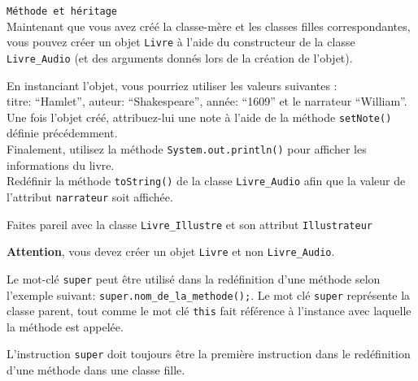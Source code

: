 \begin{Exercice}[5 minutes] \lstinline{Méthode et héritage} \\

Maintenant que vous avez créé la classe-mère et les classes filles correspondantes, vous pouvez créer un objet \lstinline{Livre} à l'aide du constructeur de la classe \lstinline{Livre_Audio} (et des arguments donnés lors de la création de l'objet).


En instanciant l'objet, vous pourriez utiliser les valeurs suivantes :\\
titre: ``Hamlet'', auteur: ``Shakespeare'', année: ``1609'' et le narrateur ``William''.\\

Une fois l'objet créé, attribuez-lui une note à l'aide de la méthode \lstinline{setNote()} définie précédemment.\\ 

Finalement, utilisez la méthode \lstinline{System.out.println()} pour afficher les informations du livre.\\

Redéfinir la méthode \lstinline{toString()} de la classe \lstinline{Livre_Audio} afin que la valeur de l'attribut \lstinline{narrateur} soit affichée.

Faites pareil avec la classe \lstinline{Livre_Illustre} et son attribut \lstinline{Illustrateur}

\begin{conseil}
\textbf{Attention}, vous devez créer un objet \lstinline{Livre} et non \lstinline{Livre_Audio}.

Le mot-clé \lstinline{super} peut être utilisé dans la redéfinition d'une méthode selon l'exemple suivant: \lstinline{super.nom_de_la_methode();}. Le mot clé \lstinline{super} représente la classe parent, tout comme le mot clé \lstinline{this} fait référence à l'instance avec laquelle la méthode est appelée. 


L'instruction \lstinline{super} doit toujours être la première instruction dans le redéfinition d'une méthode dans une classe fille. 
\end{conseil}

\begin{solution}
	
	
\end{solution}

\end{Exercice}

